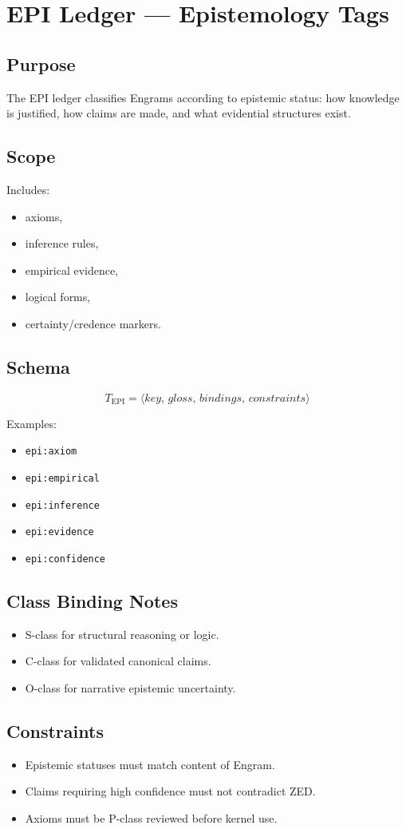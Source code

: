 \chapter{EPI Ledger --- Epistemology Tags}
\label{chap:EPI_Ledger}

\section{Purpose}

The EPI ledger classifies Engrams according to epistemic status: how knowledge
is justified, how claims are made, and what evidential structures exist.

\section{Scope}

Includes:
\begin{itemize}
    \item axioms,
    \item inference rules,
    \item empirical evidence,
    \item logical forms,
    \item certainty/credence markers.
\end{itemize}

\section{Schema}

\[
T_{\text{EPI}} = \langle key,\, gloss,\, bindings,\, constraints \rangle
\]

Examples:
\begin{itemize}
    \item \texttt{epi:axiom}
    \item \texttt{epi:empirical}
    \item \texttt{epi:inference}
    \item \texttt{epi:evidence}
    \item \texttt{epi:confidence}
\end{itemize}

\section{Class Binding Notes}

\begin{itemize}
    \item S-class for structural reasoning or logic.
    \item C-class for validated canonical claims.
    \item O-class for narrative epistemic uncertainty.
\end{itemize}

\section{Constraints}

\begin{itemize}
    \item Epistemic statuses must match content of Engram.
    \item Claims requiring high confidence must not contradict ZED.
    \item Axioms must be P-class reviewed before kernel use.
\end{itemize}
